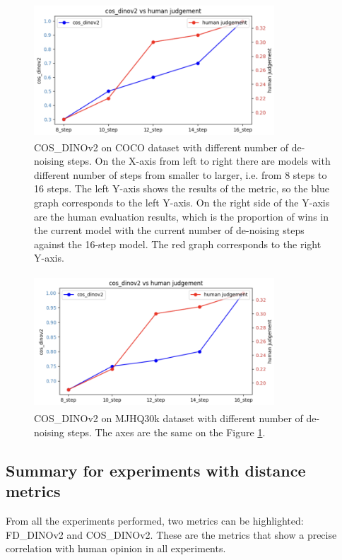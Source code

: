\begin{figure}[]
\centering
\includegraphics[width=9cm, height=5cm]{figs/coco_gen_steps_COS_DINOv2.png}
\caption{COS\_DINOv2 on COCO dataset with different number of de-noising steps. On the X-axis from left to right there are models with different number of steps from smaller to larger, i.e. from 8 steps to 16 steps. The left Y-axis shows the results of the metric, so the blue graph corresponds to the left Y-axis. On the right side of the Y-axis are the human evaluation results, which is the proportion of wins in the current model with the current number of de-noising steps against the 16-step model. The red graph corresponds to the right Y-axis.}
\label{fig:coco_gen_steps_cos_dinov2}
\end{figure}

\begin{figure}[]
\centering
\includegraphics[width=9cm, height=5cm]{figs/mjhq30k_gen_steps_COS_DINOv2.png}
\caption{COS\_DINOv2 on MJHQ30k dataset with different number of de-noising steps. The axes are the same on the Figure \ref{fig:coco_gen_steps_cos_dinov2}.}
\label{fig:mjhq30k_gen_steps_cos_dinov2}
\end{figure}

\subsection{Summary for experiments with distance metrics}
From all the experiments performed, two metrics can be highlighted: FD\_DINOv2 and COS\_DINOv2. These are the metrics that show a precise correlation with human opinion in all experiments.

